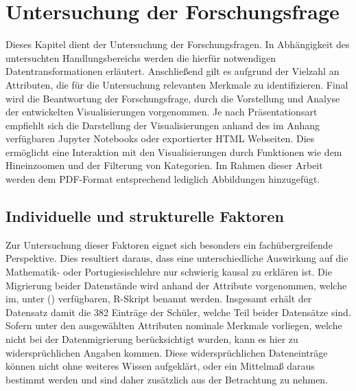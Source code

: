 \chapter[Untersuchung der Forschungsfrage]{Untersuchung der Forschungsfrage}

Dieses Kapitel dient der Untersuchung der Forschungsfragen. 
In Abhängigkeit des untersuchten Handlungsbereichs werden die hierfür notwendigen Datentransformationen erläutert. 
Anschließend gilt es aufgrund der Vielzahl an Attributen, die für die Untersuchung relevanten Merkmale zu identifizieren. 
Final wird die Beantwortung der Forschungsfrage, durch die Vorstellung und Analyse der entwickelten Visualisierungen vorgenommen.
Je nach Präsentationsart empfiehlt sich die Darstellung der Visualisierungen anhand des im Anhang verfügbaren Jupyter Notebooks oder exportierter HTML Webseiten.
Dies ermöglicht eine Interaktion mit den Visualisierungen durch Funktionen wie dem Hineinzoomen und der Filterung von Kategorien.
Im Rahmen dieser Arbeit werden dem PDF-Format entsprechend lediglich Abbildungen hinzugefügt.

\section{Individuelle und strukturelle Faktoren}

Zur Untersuchung dieser Faktoren eignet sich besonders ein fachübergreifende Perspektive. 
Dies resultiert daraus, dass eine unterschiedliche Auswirkung auf die Mathematik- oder Portugiesischlehre nur schwierig kausal zu erklären ist.
Die Migrierung beider Datenstände wird anhand der Attribute vorgenommen, welche im, unter (\cite[]{student_performance}) verfügbaren, R-Skript benannt werden.
Insgesamt erhält der Datensatz damit die 382 Einträge der Schüler, welche Teil beider Datensätze sind. 
Sofern unter den ausgewählten Attributen nominale Merkmale vorliegen, welche nicht bei der Datenmigrierung berücksichtigt wurden, kann es hier zu widersprüchlichen Angaben kommen.
Diese widersprüchlichen Dateneinträge können nicht ohne weiteres Wissen aufgeklärt, oder ein Mittelmaß daraus bestimmt werden und sind daher zusätzlich aus der Betrachtung zu nehmen.

